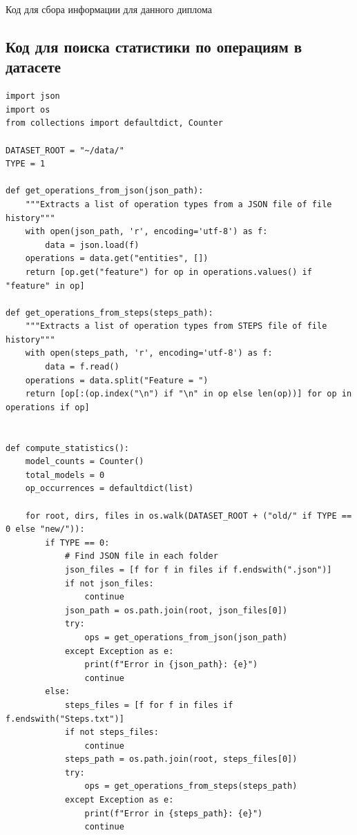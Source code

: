 

\begin{center}
{\selectfont Код для сбора информации для данного диплома}
\end{center}

\subsection{Код для поиска статистики по операциям в датасете}

\begin{lstlisting}
import json
import os
from collections import defaultdict, Counter

DATASET_ROOT = "~/data/"
TYPE = 1

def get_operations_from_json(json_path):
    """Extracts a list of operation types from a JSON file of file history"""
    with open(json_path, 'r', encoding='utf-8') as f:
        data = json.load(f)
    operations = data.get("entities", [])
    return [op.get("feature") for op in operations.values() if "feature" in op]

def get_operations_from_steps(steps_path):
    """Extracts a list of operation types from STEPS file of file history"""
    with open(steps_path, 'r', encoding='utf-8') as f:
        data = f.read()
    operations = data.split("Feature = ")
    return [op[:(op.index("\n") if "\n" in op else len(op))] for op in operations if op]


def compute_statistics():
    model_counts = Counter()
    total_models = 0
    op_occurrences = defaultdict(list)
    
    for root, dirs, files in os.walk(DATASET_ROOT + ("old/" if TYPE == 0 else "new/")):
        if TYPE == 0:
            # Find JSON file in each folder
            json_files = [f for f in files if f.endswith(".json")]
            if not json_files:
                continue
            json_path = os.path.join(root, json_files[0])
            try:
                ops = get_operations_from_json(json_path)
            except Exception as e:
                print(f"Error in {json_path}: {e}")
                continue
        else:
            steps_files = [f for f in files if f.endswith("Steps.txt")]
            if not steps_files:
                continue
            steps_path = os.path.join(root, steps_files[0])
            try:
                ops = get_operations_from_steps(steps_path)
            except Exception as e:
                print(f"Error in {steps_path}: {e}")
                continue
        

\end{lstlisting}
